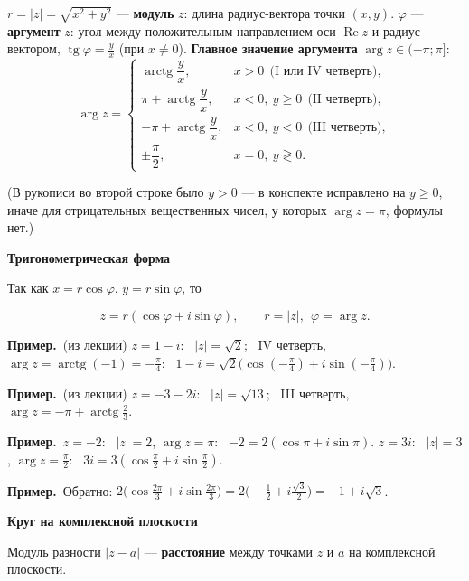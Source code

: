 \documentclass[a4paper,11pt]{article}
\DeclareMathOperator{\Rez}{Re}
\newcommand{\prim}{\par\smallskip\noindent\textbf{\textcolor{teoc!80!black}{Пример.}}\ }
\newcommand{\podr}[1]{\par\needspace{8\baselineskip}\medskip
  {\large\bfseries\textcolor{oprc!80!black}{#1}}\par\nopagebreak\smallskip}
\begin{document}
\begin{opr}
$r = |z| = \sqrt{x^2 + y^2}$ --- \textbf{модуль} $z$: длина радиус-вектора точки $(x, y)$.
$\varphi$ --- \textbf{аргумент} $z$: угол между положительным направлением оси $\Rez z$ и радиус-вектором,
$\operatorname{tg}\varphi = \frac yx$ (при $x \ne 0$). \textbf{Главное значение аргумента} $\arg z \in (-\pi; \pi]$:
\[
  \arg z = \begin{cases}
    \operatorname{arctg}\dfrac yx, & x > 0 \ \ \text{(I или IV четверть)}, \\[4pt]
    \pi + \operatorname{arctg}\dfrac yx, & x < 0,\ y \ge 0 \ \ \text{(II четверть)}, \\[4pt]
    -\pi + \operatorname{arctg}\dfrac yx, & x < 0,\ y < 0 \ \ \text{(III четверть)}, \\[4pt]
    \pm\dfrac\pi2, & x = 0,\ y \gtrless 0.
  \end{cases}
\]
\end{opr}

{\small\textcolor{zamc}{(В рукописи во второй строке было $y > 0$ --- в конспекте исправлено на $y \ge 0$, иначе для отрицательных
вещественных чисел, у которых $\arg z = \pi$, формулы нет.)}}

\podr{Тригонометрическая форма}

Так как $x = r\cos\varphi$, $y = r\sin\varphi$, то
\begin{opr}
\[
  z = r(\cos\varphi + i\sin\varphi), \qquad r = |z|, \ \ \varphi = \arg z.
\]
\end{opr}

\prim (из лекции) $z = 1 - i$: \ $|z| = \sqrt2$; \ IV четверть, $\arg z = \operatorname{arctg}(-1) = -\frac\pi4$:
\ $1 - i = \sqrt2\bigl(\cos(-\frac\pi4) + i\sin(-\frac\pi4)\bigr)$.

\prim (из лекции) $z = -3 - 2i$: \ $|z| = \sqrt{13}$; \ III четверть, $\arg z = -\pi + \operatorname{arctg}\frac23$.

\prim $z = -2$: \ $|z| = 2$, $\arg z = \pi$: \ $-2 = 2(\cos\pi + i\sin\pi)$. \quad
$z = 3i$: \ $|z| = 3$, $\arg z = \frac\pi2$: \ $3i = 3(\cos\frac\pi2 + i\sin\frac\pi2)$.

\prim Обратно: $2\bigl(\cos\frac{2\pi}{3} + i\sin\frac{2\pi}{3}\bigr) = 2\bigl(-\frac12 + i\frac{\sqrt3}{2}\bigr) = -1 + i\sqrt3$.

\podr{Круг на комплексной плоскости}

Модуль разности $|z - a|$ --- \textbf{расстояние} между точками $z$ и $a$ на комплексной плоскости.
\end{document}
